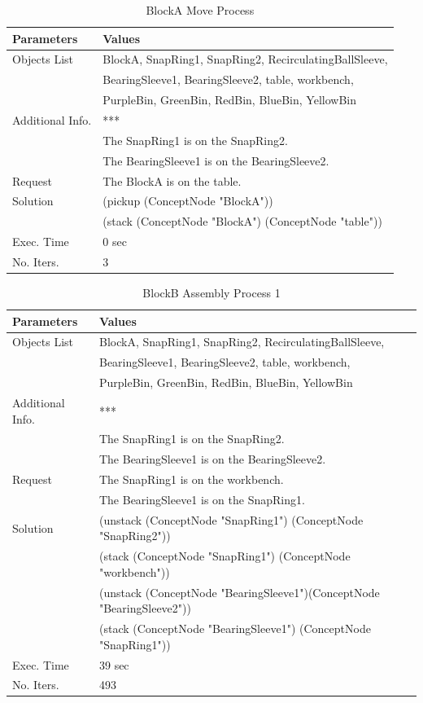 \begin{table}[htbp]
  \centering
  \caption{BlockA Move Process}\label{tab:ass_A_2}
  \medskip
\begin{tabular}{ll}
\toprule
\textbf{Parameters} &  \textbf{Values}  \\
\midrule
\rowcolor{gray!25}
Objects List &  BlockA, SnapRing1, SnapRing2, RecirculatingBallSleeve, \\
\rowcolor{gray!25}
& BearingSleeve1, BearingSleeve2, table, workbench, \\
\rowcolor{gray!25}
&  PurpleBin, GreenBin, RedBin, BlueBin, YellowBin \\
Additional Info. & *** \\
& The SnapRing1 is on the SnapRing2. \\
& The BearingSleeve1 is on the BearingSleeve2. \\
\rowcolor{gray!25}
Request & The BlockA is on the table. \\
Solution & (pickup (ConceptNode "BlockA")) \\
& (stack (ConceptNode "BlockA") (ConceptNode "table")) \\
\rowcolor{gray!25}
Exec. Time & 0 sec \\
No. Iters. & 3 \\	
\bottomrule
\end{tabular}
\end{table}

\begin{table}[htbp]
  \centering
  \caption{BlockB Assembly Process 1}\label{tab:ass_B_1}
  \medskip
\begin{tabular}{ll}
\toprule
\textbf{Parameters} &  \textbf{Values}  \\
\midrule
\rowcolor{gray!25}
Objects List &  BlockA, SnapRing1, SnapRing2, RecirculatingBallSleeve, \\
\rowcolor{gray!25}
& BearingSleeve1, BearingSleeve2, table, workbench, \\
\rowcolor{gray!25}
&  PurpleBin, GreenBin, RedBin, BlueBin, YellowBin \\
Additional Info. & *** \\
& The SnapRing1 is on the SnapRing2. \\
& The BearingSleeve1 is on the BearingSleeve2. \\
\rowcolor{gray!25}
Request & The SnapRing1 is on the workbench. \\
\rowcolor{gray!25}
& The BearingSleeve1 is on the SnapRing1. \\
Solution & (unstack (ConceptNode "SnapRing1") (ConceptNode "SnapRing2")) \\
& (stack (ConceptNode "SnapRing1") (ConceptNode "workbench")) \\
& (unstack (ConceptNode "BearingSleeve1")(ConceptNode "BearingSleeve2")) \\
& (stack (ConceptNode "BearingSleeve1") (ConceptNode "SnapRing1")) \\
\rowcolor{gray!25}
Exec. Time & 39 sec \\
No. Iters. & 493 \\	
\bottomrule
\end{tabular}
\end{table}

